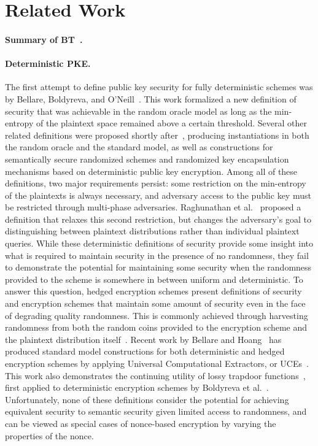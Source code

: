 \section{Related Work}
\label{rel_wk}
\paragraph{Summary of BT~\cite{BellareTackmann}. }

\paragraph{Deterministic PKE. }
The first attempt to define public key security for fully deterministic schemes was by Bellare, Boldyreva, and O'Neill~\cite{BBO07}.
This work formalized a new definition of security that was achievable in the random oracle model as long as the min-entropy
of the plaintext space remained above a certain threshold.  Several other related definitions were proposed shortly after~\cite{BFOR08,BSO08},
producing instantiations in both the random oracle and the standard model, as well as constructions for semantically secure randomized schemes
and randomized key encapsulation mechanisms based on deterministic public key encryption.
Among all of these definitions, two major requirements persist: some restriction on the min-entropy of the plaintexts is always necessary, and
adversary access to the public key must be restricted through multi-phase adversaries. Raghunathan et al.~\cite{RSV13} proposed
a definition that relaxes this second restriction, but changes the adversary's goal to distinguishing between plaintext distributions
rather than individual plaintext queries.  While these deterministic definitions of security provide some insight into what is
required to maintain security in the presence of no randomness, they fail to demonstrate the potential for maintaining some
security when the randomness provided to the scheme is somewhere in between uniform and deterministic.  To answer
this question, hedged encryption schemes present definitions of security and encryption schemes that maintain some
amount of security even in the face of degrading quality randomness.  This is commonly achieved through harvesting randomness
from both the random coins provided to the encryption scheme and the plaintext distribution itself~\cite{BBNRTSSHY2009}.  
Recent work by Bellare and Hoang~\cite{BH15}
has produced standard model constructions for both deterministic and hedged encryption schemes by applying Universal Computational Extractors,
or UCEs~\cite{BHK13}.  This work also demonstrates the continuing utility of lossy trapdoor functions~\cite{PW11}, first applied to deterministic encryption
schemes by Boldyreva et al.~\cite{BSO08}.  Unfortunately, none of these definitions consider the potential for achieving equivalent security to 
semantic security given limited access to randomness, and can be viewed as special cases of nonce-based encryption by varying the
properties of the nonce.

